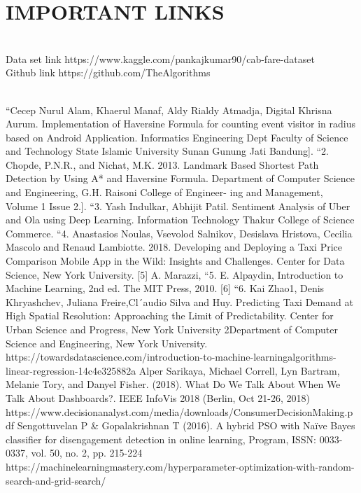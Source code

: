 \documentclass[journal,twoside,web]{ieeecolor}
\begin{document}
\section{IMPORTANT LINKS}
\label{IMPORTANT LINKS}
\\
Data set link
https://www.kaggle.com/pankajkumar90/cab-fare-dataset
\\
Github link
https://github.com/TheAlgorithms


\begin{thebibliography}{00}
\\
“Cecep Nurul Alam, Khaerul Manaf, Aldy Rialdy Atmadja, Digital Khrisna Aurum. Implementation of Haversine Formula for counting event visitor in radius based on Android Application. Informatics Engineering Dept Faculty of Science and Technology State Islamic University Sunan Gunung Jati Bandung].
“2. Chopde, P.N.R., and Nichat, M.K. 2013. Landmark Based Shortest Path Detection by Using A* and Haversine Formula. Department of Computer Science and Engineering, G.H. Raisoni College of Engineer- ing and Management, Volume 1 Issue 2.].
“3. Yash Indulkar,  Abhijit  Patil.  Sentiment  Analysis  of  Uber  and  Ola using Deep Learning. Information Technology Thakur College of Science Commerce.
“4. Anastasios Noulas, Vsevolod Salnikov, Desislava Hristova, Cecilia Mascolo and Renaud Lambiotte. 2018. Developing and Deploying a Taxi Price Comparison Mobile App in the Wild: Insights and Challenges. Center for Data Science, New York University.
[5]	A. Marazzi, “5. E. Alpaydin, Introduction to Machine Learning, 2nd ed. The MIT Press, 2010.
[6]	“6. Kai Zhao1, Denis Khryashchev, Juliana Freire,Cl´audio Silva and Huy. Predicting Taxi Demand at High Spatial Resolution: Approaching the Limit of Predictability. Center for Urban Science and Progress, New York University 2Department of Computer Science and Engineering, New York University.
https://towardsdatascience.com/introduction-to-machine-learningalgorithms-linear-regression-14c4e325882a
Alper Sarikaya, Michael Correll, Lyn Bartram, Melanie Tory, and Danyel Fisher. (2018). What Do We Talk About When We Talk About Dashboards?. IEEE InfoVis 2018 (Berlin, Oct 21-26, 2018)
https://www.decisionanalyst.com/media/downloads/ConsumerDecisionMaking.pdf
Sengottuvelan P & Gopalakrishnan T (2016). A hybrid PSO with Naïve Bayes classifier for disengagement detection in online learning, Program, ISSN: 0033-0337, vol. 50, no. 2, pp. 215-224
\\
https://machinelearningmastery.com/hyperparameter-optimization-with-random-search-and-grid-search/

\end{thebibliography}
\end{document}
